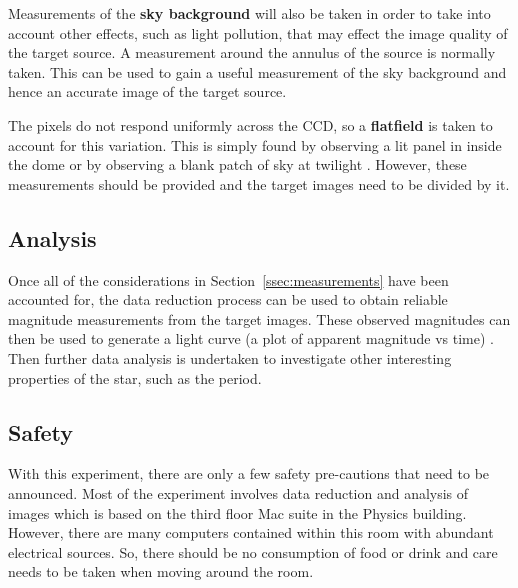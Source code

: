 \documentclass{article}
\newcommand{\secref}[2][Section~]{#1\ref{#2}}
\begin{document}
\vspace{2mm}
\noindent
Measurements of the \textbf{sky background} will also be taken in order to take into account other effects, such as light pollution, that may effect the image quality of the target source. A measurement around the annulus of the source \cite{Paper01} is normally taken. This can be used to gain a useful measurement of the sky background and hence an accurate image of the target source.

\vspace{2mm}
\noindent
The pixels do not respond uniformly across the CCD, so a \textbf{flatfield} is taken to account for this variation. This is simply found by observing a lit panel in inside the dome or by observing a blank patch of sky at twilight \cite{Paper01}. However, these measurements should be provided and the target images need to be divided by it.

\subsection{Analysis}
\label{ssec:analysis}

Once all of the considerations in \secref{ssec:measurements} have been accounted for, the data reduction process can be used to obtain reliable magnitude measurements from the target images. These observed magnitudes can then be used to generate a light curve (a plot of apparent magnitude vs time) \cite{Paper01}. Then further data analysis is undertaken to investigate other interesting properties of the star, such as the period.

\subsection{Safety}
\label{ssec:safety}

With this experiment, there are only a few safety pre-cautions that need to be announced. Most of the experiment involves data reduction and analysis of images which is based on the third floor Mac suite in the Physics building. However, there are many computers contained within this room with abundant electrical sources. So, there should be no consumption of food or drink and care needs to be taken when moving around the room.

\end{document}
